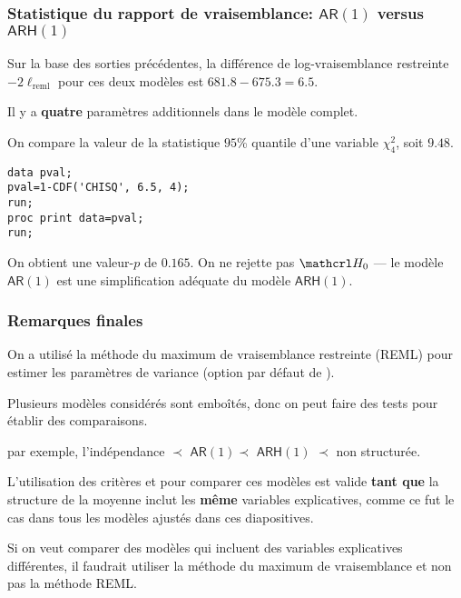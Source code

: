 \documentclass{beamer}
\begin{document}
\begin{frame}[fragile]
\frametitle{Statistique du rapport de vraisemblance: $\mathsf{AR}(1)$ versus $\mathsf{ARH}(1)$}
\bi
\item Sur la base des sorties précédentes, la différence de log-vraisemblance restreinte $-2\ell_{\textrm{reml}}$ pour ces deux modèles est $681.8-675.3=6.5$.
\item Il y a \textbf{quatre} paramètres additionnels dans le modèle complet. 

On compare la valeur de la statistique $95$\% quantile d'une variable $\chi^2_4$, soit $9.48$.

\begin{tcolorbox}[colback=white,colframe=hecblue,title=Code \SASlang{} pour calculer la valeur-$p$ avec la loi nulle $\chi^2_4$]
\begin{verbatim}
data pval;
pval=1-CDF('CHISQ', 6.5, 4);
run;
proc print data=pval;
run;
\end{verbatim}
\end{tcolorbox}
\item On obtient une valeur-$p$ de $0.165$. On ne rejette pas $\Hy_0$ --- le modèle $\mathsf{AR}(1)$ est une simplification adéquate du modèle $\mathsf{ARH}(1)$.
\ei
\end{frame}

\begin{frame}
\frametitle{Remarques finales}
\bi
\item On a utilisé la méthode du maximum de vraisemblance restreinte (REML) pour estimer les paramètres de variance (option par défaut de ). 
\item Plusieurs modèles considérés sont emboîtés, donc on peut faire des tests pour établir des comparaisons.
\bi \item par exemple, l'indépendance $\prec$ $\mathsf{AR}(1)$$\prec$ $\mathsf{ARH}(1)$ $\prec$ non structurée.
\ei
\item L'utilisation des critères \AIC{} et \BIC{} pour comparer ces modèles est valide \textbf{tant que} la structure de la moyenne inclut les \textbf{même} variables explicatives, comme ce fut le cas dans tous les modèles ajustés dans ces diapositives.
\item Si on veut comparer des modèles qui incluent des variables explicatives différentes, il faudrait utiliser la méthode du maximum de vraisemblance et non pas la méthode REML.
\ei
\end{frame}
\end{document}
